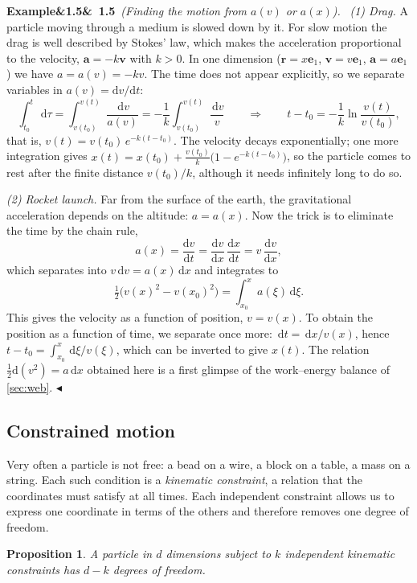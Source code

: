 \documentclass[11pt,a4paper,oneside]{report}
\numberwithin{equation}{chapter}
\newcommand{\vect}[1]{\bm{#1}}
\newcommand{\e}[1]{\vect{e}_{#1}}
\newcommand{\dd}{\,\mathrm{d}}
\newcommand{\dv}[2]{\frac{\mathrm{d}#1}{\mathrm{d}#2}}
\theoremstyle{plain}
\newtheorem{proposition}[theorem]{Proposition}
\theoremstyle{definition}
\theoremstyle{remark}
\newenvironment{example}[2]{%
  \par\addvspace{\bigskipamount}\noindent
  \textbf{Example\ifx&#1&\else~#1\fi}\ \textit{(#2).}\ \ignorespaces}%
  {\hfill$\blacktriangleleft$\par\addvspace{\bigskipamount}}
\begin{document}
\begin{example}{1.5}{Finding the motion from $a(v)$ or $a(x)$}
\emph{(1) Drag.} A particle moving through a medium is slowed down by it. For slow motion the drag is well
described by Stokes' law, which makes the acceleration proportional to the velocity, $\vect a=-k\vect v$ with
$k>0$. In one dimension ($\vect r=x\e1$, $\vect v=v\e1$, $\vect a=a\e1$) we have $a=a(v)=-kv$. The time does not
appear explicitly, so we separate variables in $a(v)=\mathrm dv/\mathrm dt$:
\[
  \int_{t_0}^{t}\dd\tau=\int_{v(t_0)}^{v(t)}\frac{\dd v}{a(v)}=-\frac1k\int_{v(t_0)}^{v(t)}\frac{\dd v}{v}
  \qquad\Longrightarrow\qquad t-t_0=-\frac1k\ln\frac{v(t)}{v(t_0)} ,
\]
that is, $v(t)=v(t_0)\,e^{-k(t-t_0)}$. The velocity decays exponentially; one more integration gives
$x(t)=x(t_0)+\frac{v(t_0)}{k}\big(1-e^{-k(t-t_0)}\big)$, so the particle comes to rest after the finite distance
$v(t_0)/k$, although it needs infinitely long to do so.

\emph{(2) Rocket launch.} Far from the surface of the earth, the gravitational acceleration depends on the altitude:
$a=a(x)$. Now the trick is to eliminate the time by the chain rule,
\[
  a(x)=\dv{v}{t}=\dv{v}{x}\,\dv{x}{t}=v\,\dv{v}{x},
\]
which separates into $v\dd v=a(x)\dd x$ and integrates to
\[
  \tfrac12\big(v(x)^2-v(x_0)^2\big)=\int_{x_0}^{x}a(\xi)\dd\xi .
\]
This gives the velocity as a function of position, $v=v(x)$. To obtain the position as a function of time, we
separate once more: $\dd t=\dd x/v(x)$, hence $t-t_0=\int_{x_0}^{x}\dd\xi/v(\xi)$, which can be inverted to give
$x(t)$. The relation $\frac12\mathrm d(v^2)=a\dd x$ obtained here is a first glimpse of the work--energy balance of
\cref{sec:web}.
\end{example}

\subsection{Constrained motion}
Very often a particle is not free: a bead on a wire, a block on a table, a mass on a string. Each such condition is a
\emph{kinematic constraint}, a relation that the coordinates must satisfy at all times. Each independent constraint
allows us to express one coordinate in terms of the others and therefore removes one degree of freedom.

\begin{proposition}
A particle in $d$ dimensions subject to $k$ independent kinematic constraints has $d-k$ degrees of freedom.
\end{proposition}
\end{document}
